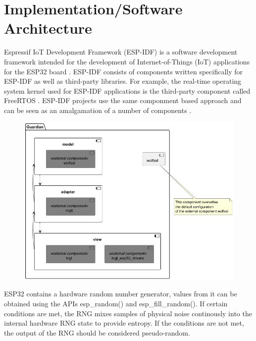 \section{Implementation/Software Architecture}
Espressif IoT Development Framework (ESP-IDF) is a software development framework intended for the development of Internet-of-Things (IoT) applications for the ESP32 board \cite[3]{esp-idf}. ESP-IDF consists of components written specifically for ESP-IDF as well as third-party libraries.\cite[123]{esp-idf} For example, the real-time operating system kernel used for ESP-IDF applications is the third-party component called FreeRTOS \cite[1893]{esp-idf}. ESP-IDF projects use the same componment based approach and can be seen as an amalgamation of a number of components \cite[2240]{esp-idf}.

\begin{figure}
	\centering
	\includegraphics[width=1\textwidth]{abbildungen/Diagramme/components.png}
	\caption{}
	\label{Fig:uml-classes-python}
\end{figure}




ESP32 contains a hardware random number generator, values from it can be obtained using the APIs esp_random() and esp_fill_random(). If certain conditions are met, the RNG mixes samples of physical noise continously into the internal hardware RNG state to provide entropy. If the conditions are not met, the output of the RNG should be considered pseudo-random. \cite[2140]{esp-idf}




